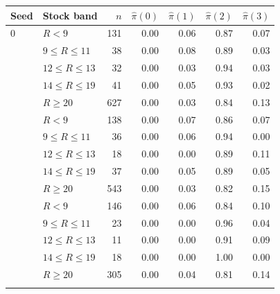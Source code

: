 \begin{tabular}{llrrrrr}
\toprule
Seed & Stock band & $n$ & $\hat\pi(0)$ & $\hat\pi(1)$ & $\hat\pi(2)$ & $\hat\pi(3)$ \\
\midrule
0 & $R<9$ & 131 & 0.00 & 0.06 & 0.87 & 0.07 \\
 & $9\le R\le 11$ & 38 & 0.00 & 0.08 & 0.89 & 0.03 \\
 & $12\le R\le 13$ & 32 & 0.00 & 0.03 & 0.94 & 0.03 \\
 & $14\le R\le 19$ & 41 & 0.00 & 0.05 & 0.93 & 0.02 \\
 & $R\ge 20$ & 627 & 0.00 & 0.03 & 0.84 & 0.13 \\
\addlinespace
1 & $R<9$ & 138 & 0.00 & 0.07 & 0.86 & 0.07 \\
 & $9\le R\le 11$ & 36 & 0.00 & 0.06 & 0.94 & 0.00 \\
 & $12\le R\le 13$ & 18 & 0.00 & 0.00 & 0.89 & 0.11 \\
 & $14\le R\le 19$ & 37 & 0.00 & 0.05 & 0.89 & 0.05 \\
 & $R\ge 20$ & 543 & 0.00 & 0.03 & 0.82 & 0.15 \\
\addlinespace
2 & $R<9$ & 146 & 0.00 & 0.06 & 0.84 & 0.10 \\
 & $9\le R\le 11$ & 23 & 0.00 & 0.00 & 0.96 & 0.04 \\
 & $12\le R\le 13$ & 11 & 0.00 & 0.00 & 0.91 & 0.09 \\
 & $14\le R\le 19$ & 18 & 0.00 & 0.00 & 1.00 & 0.00 \\
 & $R\ge 20$ & 305 & 0.00 & 0.04 & 0.81 & 0.14 \\
\addlinespace
\bottomrule
\end{tabular}
